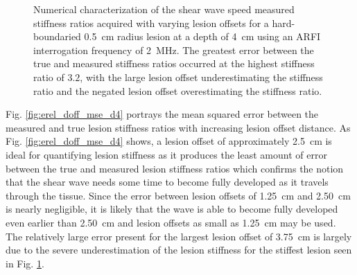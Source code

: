 			\begin{figure}[!htb]
				\centering
				\caption[Numerical characterization of shear wave speed measured stiffness ratio with changing lesion offsets]{Numerical characterization of the shear wave speed measured stiffness ratios acquired with varying lesion offsets for a hard-boundaried \SI{0.5}{cm} radius lesion at a depth of \SI{4}{\cm} using an ARFI interrogation frequency of \SI{2}{\MHz}. The greatest error between the true and measured stiffness ratios occurred at the highest stiffness ratio of $3.2$, with the large lesion offset underestimating the stiffness ratio and the negated lesion offset overestimating the stiffness ratio.}
				\label{fig:erel_doff_d4}
			\end{figure}

			Fig. \ref{fig:erel_doff_mse_d4} portrays the mean squared error between the measured and true lesion stiffness ratios with increasing lesion offset distance. As Fig. \ref{fig:erel_doff_mse_d4} shows, a lesion offset of approximately \SI{2.5}{\cm} is ideal for quantifying lesion stiffness as it produces the least amount of error between the true and measured lesion stiffness ratios which confirms the notion that the shear wave needs some time to become fully developed as it travels through the tissue. Since the error between lesion offsets of \SI{1.25}{\cm} and \SI{2.50}{\cm} is nearly negligible, it is likely that the wave is able to become fully developed even earlier than \SI{2.50}{\cm} and lesion offsets as small as \SI{1.25}{\cm} may be used. The relatively large error present for the largest lesion offset of \SI{3.75}{\cm} is largely due to the severe underestimation of the lesion stiffness for the stiffest lesion seen in Fig. \ref{fig:erel_doff_d4}.

